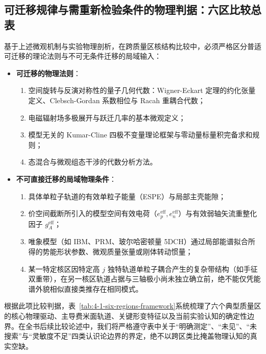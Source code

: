 \subsection{可迁移规律与需重新检验条件的物理判据：六区比较总表}\label{sec:4-1-5}

基于上述微观机制与实验物理剖析，在跨质量区核结构比较中，必须严格区分普适可迁移的理论法则与不可无条件迁移的局域输入：
\begin{itemize}
\item \textbf{可迁移的物理法则}：
  \begin{enumerate}
  \item 空间旋转与反演对称性的量子几何代数：Wigner-Eckart 定理的约化张量定义、Clebsch-Gordan 系数相位与 Racah 重耦合代数\cite{book-suhonen-from-nucleons-to-nucleus}；
  \item 电磁辐射场多极展开与跃迁几率的基本微观定义；
  \item 模型无关的 Kumar-Cline 四极不变量理论框架与零动量标量积完备求和规则\cite{cline-1986-nuclear-shapes-coulomb-excitation}；
  \item 态混合与微观组态干涉的代数分析方法。
  \end{enumerate}
\item \textbf{不可直接迁移的局域物理条件}：
  \begin{enumerate}
  \item 具体单粒子轨道的有效单粒子能量（ESPE）与局部主壳能隙；
  \item 价空间截断所引入的模型空间有效电荷（$e_p^{\mathrm{eff}}, e_n^{\mathrm{eff}}$）与有效弱轴矢流重整化因子 $g_A^{\mathrm{eff}}$；
  \item 唯象模型（如 IBM、PRM、玻尔哈密顿量 5DCH）通过局部能谱拟合所得的势能形状参数、微观质量张量或刚体转动惯量；
  \item 某一特定核区因特定高 $j$ 独特轨道单粒子耦合产生的复杂带结构（如手征双重带），在另一核区轨道占据与三轴极小尚未独立确立前，绝不能仅凭能谱外貌相似直接类推存在相同模式。
  \end{enumerate}
\end{itemize}

根据此项比较判据，表~\ref{tab:4-1-six-regions-framework}系统梳理了六个典型质量区的核心物理驱动、主导费米面轨道、关键形变特征以及当前实验认知的确定性边界。在全书后续比较论述中，我们将严格遵守表中关于``明确测定''、``未见''、``未搜索''与``灵敏度不足''四类认识论边界的界定，绝不以跨区类比掩盖物理认知的真实空缺。

